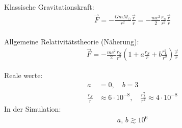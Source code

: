 \documentclass[a4paper, 14pt, fleqn, notitlepage]{scrartcl}
\newcommand{\unitr}{\frac{\vec{r}}{r}}
\begin{document}
\noindent
\begin{minipage}[t]{0.5\paperwidth}
  Klassische Gravitationskraft:
  \begin{align*}
    \vec{F} = - \frac{G m M_\odot}{r^2} \unitr = - \frac{mc^2}{2} \frac{r_S}{r^2} \unitr
  \end{align*}\\[0.5em]
  Allgemeine Relativitätstheorie (Näherung):
  \begin{align*}
    \vec{F} = - \frac{mc^2}{2} \frac{r_S}{r^2} \left(1 + a \frac{r_S}{r} + b \frac{r_L^2}{r^2}\right) \unitr
  \end{align*}
\end{minipage}
\begin{minipage}[t]{0.5\paperwidth}
  Reale werte:
  \begin{align*}
    a &= 0, \quad b = 3\\[0.5em]
    \frac{r_S}{r} &\approx 6 \cdot 10^{-8}, \quad \frac{r_L^2}{r^2} \approx 4 \cdot 10^{-8}
  \end{align*}
  In der Simulation:
  \begin{align*}
    a,\, b \gtrsim 10^{6}
  \end{align*}
\end{minipage}
\end{document}
